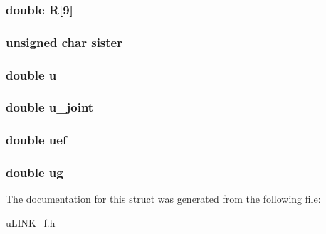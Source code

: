 \hypertarget{struct_s_struct__u_l_i_n_k_ae9c91fd01a63a2b635a1796a4b713b86}{
\subsubsection[{R}]{\setlength{\rightskip}{0pt plus 5cm}double R\mbox{[}9\mbox{]}}}\label{struct_s_struct__u_l_i_n_k_ae9c91fd01a63a2b635a1796a4b713b86}
\hypertarget{struct_s_struct__u_l_i_n_k_a68e11b780e786b30f244ec27648e7d96}{
\subsubsection[{sister}]{\setlength{\rightskip}{0pt plus 5cm}unsigned char sister}}\label{struct_s_struct__u_l_i_n_k_a68e11b780e786b30f244ec27648e7d96}
\hypertarget{struct_s_struct__u_l_i_n_k_aed08c8478a62910aab06ba708a0e5b5f}{
\subsubsection[{u}]{\setlength{\rightskip}{0pt plus 5cm}double u}}\label{struct_s_struct__u_l_i_n_k_aed08c8478a62910aab06ba708a0e5b5f}
\hypertarget{struct_s_struct__u_l_i_n_k_a4c825b6298857a29278ccd8a7b731863}{
\subsubsection[{u\-\_\-joint}]{\setlength{\rightskip}{0pt plus 5cm}double u\-\_\-joint}}\label{struct_s_struct__u_l_i_n_k_a4c825b6298857a29278ccd8a7b731863}
\hypertarget{struct_s_struct__u_l_i_n_k_a48e660e5c4e92e6b18ac669bf27e5972}{
\subsubsection[{uef}]{\setlength{\rightskip}{0pt plus 5cm}double uef}}\label{struct_s_struct__u_l_i_n_k_a48e660e5c4e92e6b18ac669bf27e5972}
\hypertarget{struct_s_struct__u_l_i_n_k_a26599157c0b45c8f13eb679ca9a2a491}{
\subsubsection[{ug}]{\setlength{\rightskip}{0pt plus 5cm}double ug}}\label{struct_s_struct__u_l_i_n_k_a26599157c0b45c8f13eb679ca9a2a491}


The documentation for this struct was generated from the following file\-:\begin{DoxyCompactItemize}
\item 
\hyperlink{u_l_i_n_k__f_8h}{u\-L\-I\-N\-K\-\_\-f.\-h}\end{DoxyCompactItemize}
